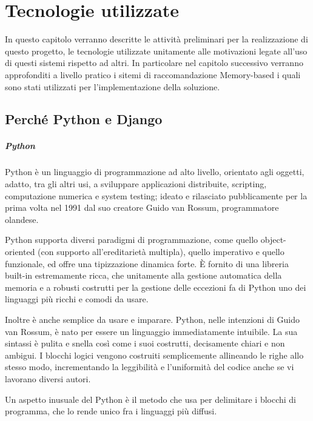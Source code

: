 \chapter{Tecnologie utilizzate}
\label{chp:02-technologies}
In questo capitolo verranno descritte le attività preliminari per la realizzazione di questo progetto, le tecnologie utilizzate
unitamente alle motivazioni legate all'uso di questi sistemi rispetto ad altri. In particolare nel capitolo successivo verranno 
approfonditi a livello pratico i sitemi di raccomandazione Memory-based i quali sono stati utilizzati per l'implementazione della
soluzione. 


\section{Perché Python e Django}
\paragraph{Python}
Python è un linguaggio di programmazione ad alto livello, orientato agli oggetti, adatto, tra gli altri usi, a sviluppare applicazioni 
distribuite, scripting, computazione numerica e system testing; ideato e rilasciato pubblicamente per la prima volta nel 1991 dal suo 
creatore Guido van Rossum, programmatore olandese.

Python supporta diversi paradigmi di programmazione, come quello object-oriented (con supporto all'ereditarietà multipla), quello 
imperativo e quello funzionale, ed offre una tipizzazione dinamica forte. È fornito di una libreria built-in estremamente ricca, che 
unitamente alla gestione automatica della memoria e a robusti costrutti per la gestione delle eccezioni fa di Python uno dei linguaggi 
più ricchi e comodi da usare.

Inoltre è anche semplice da usare e imparare. Python, nelle intenzioni di Guido van Rossum, è nato per essere un linguaggio 
immediatamente intuibile. La sua sintassi è pulita e snella così come i suoi costrutti, decisamente chiari e non ambigui. I blocchi 
logici vengono costruiti semplicemente allineando le righe allo stesso modo, incrementando la leggibilità e l'uniformità del codice 
anche se vi lavorano diversi autori.

Un aspetto inusuale del Python è il metodo che usa per delimitare i blocchi di programma, che lo rende unico fra i linguaggi più diffusi.

